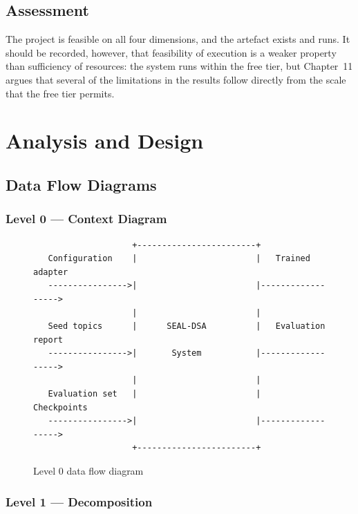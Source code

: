 \documentclass[12pt,a4paper]{report}
\begin{document}
\section{Assessment}

The project is feasible on all four dimensions, and the artefact exists and runs. It should be recorded, however, that feasibility of execution is a weaker property than sufficiency of resources: the system runs within the free tier, but Chapter~11 argues that several of the limitations in the results follow directly from the scale that the free tier permits.

\chapter{Analysis and Design}

\section{Data Flow Diagrams}

\subsection{Level 0 --- Context Diagram}

\begin{figure}[htbp]
\centering
\begin{verbatim}
                    +------------------------+
   Configuration    |                        |   Trained adapter
   ---------------->|                        |------------------>
                    |                        |
   Seed topics      |      SEAL-DSA          |   Evaluation report
   ---------------->|       System           |------------------>
                    |                        |
   Evaluation set   |                        |   Checkpoints
   ---------------->|                        |------------------>
                    +------------------------+
\end{verbatim}
\caption{Level 0 data flow diagram}
\end{figure}

\subsection{Level 1 --- Decomposition}
\end{document}
